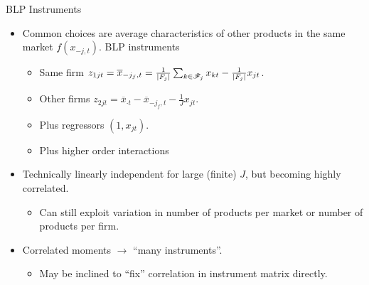 \documentclass[aspectratio=169,10pt]{beamer}
\begin{document}
\begin{frame}{BLP Instruments}
\begin{itemize}
\item Common choices are average characteristics of other products in the same market $f(x_{-j,t})$. \alert{BLP instruments}
\begin{itemize}
\item Same firm $z_{1jt} = \overline{x}_{-j_f,t} = \frac{1}{\left\vert{F_j}\right\vert}  \sum_{k \in \mathscr{F}_j} x_{kt} - \frac{1}{\left\vert{F_j}\right\vert} x_{jt}$.
\item Other firms $z_{2jt}=\overline{x}_{\cdot t} - \overline{x}_{-j_f,t} - \frac{1}{J} x_{jt}$.
\item Plus regressors $(1, x_{jt})$.
\item Plus higher order interactions 
\end{itemize}
\item Technically linearly independent for large (finite) $J$, but becoming highly correlated.
\begin{itemize}
\item Can still exploit variation in number of products per market or number of products per firm.
\end{itemize}
\item Correlated moments $\rightarrow$ ``many instruments''.
\begin{itemize}
\item May be inclined to ``fix'' correlation in instrument matrix directly.
\end{itemize}
\end{itemize}
\end{frame}


\end{document}
